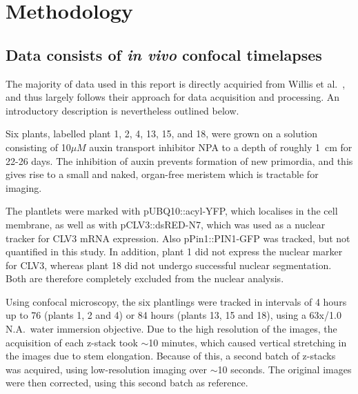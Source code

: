 
\chapter{Methodology}

\ifpdf
\graphicspath{{Chapter2/Figs/Raster/}{Chapter2/Figs/PDF/}{Chapter2/Figs/}}
\else
\graphicspath{{Chapter2/Figs/Vector/}{Chapter2/Figs/}}
\fi

\section[Raw data]{Data consists of \textit{in vivo} confocal timelapses}
The majority of data used in this report is directly acquiried from Willis et
al.~\cite{willis2016cell}, and thus largely follows their approach for data
acquisition and processing. An introductory description is nevertheless outlined
below. 

Six plants, labelled plant 1, 2, 4, 13, 15, and 18, were grown on a
solution consisting of 10$\mu M$ auxin transport inhibitor NPA to a depth of
roughly 1~cm for 22-26 days. The inhibition of auxin prevents formation of new
primordia, and this gives rise to a small and naked, organ-free meristem which is
tractable for imaging. 

The plantlets were marked with pUBQ10::acyl-YFP, which localises in the cell
membrane, as well as with pCLV3::dsRED-N7, which was used
as a nuclear tracker for CLV3 mRNA expression. Also pPin1::PIN1-GFP was tracked,
but not quantified in this study. In addition, plant 1 did not express the nuclear marker
for CLV3, whereas plant 18 did not undergo successful nuclear segmentation. Both
are therefore completely excluded from the nuclear analysis.

Using confocal microscopy, the six plantlings were tracked in
intervals of 4 hours up to 76 (plants 1, 2 and 4) or 84 hours
(plants 13, 15 and 18), using a 63x/1.0 N.A.\ water immersion objective.
Due to the high resolution of the images, the acquisition of each z-stack took
$\sim$10 minutes, which caused vertical stretching in the images due to stem
elongation. Because of this, a second batch of z-stacks was acquired, using
low-resolution imaging over $\sim$10 seconds. The original images were then
corrected, using this second batch as reference.

